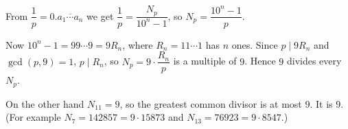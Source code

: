 From $\dfrac1p=0.\overline{a_1\cdots a_n}$ we get $\dfrac1p=\dfrac{N_p}{10^n-1}$, so $N_p=\dfrac{10^n-1}{p}$.

Now $10^n-1=99\cdots9=9R_n$, where $R_n=11\cdots1$ has $n$ ones. Since $p\mid9R_n$ and $\gcd(p,9)=1$, $p\mid R_n$, so $N_p=9\cdot\dfrac{R_n}{p}$ is a multiple of $9$. Hence $9$ divides every $N_p$.

On the other hand $N_{11}=9$, so the greatest common divisor is at most $9$. It is $\boxed{9}$. (For example $N_7=142857=9\cdot15873$ and $N_{13}=76923=9\cdot8547$.)

